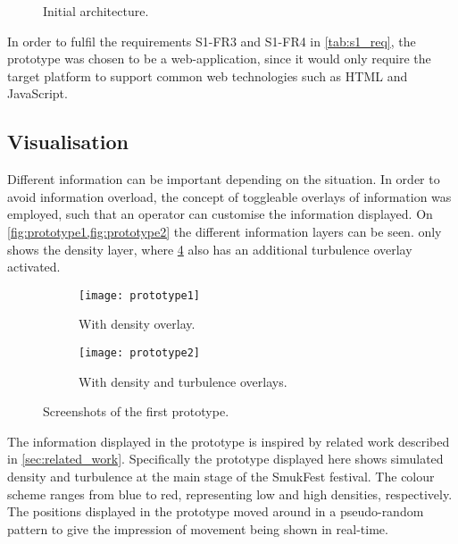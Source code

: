 \begin{figure}[htbp]
    \centering
    \caption{Initial architecture.}
    \label{fig:init_architecture}
\end{figure}


In order to fulfil the requirements S1-FR3 and S1-FR4 in \cref{tab:s1_req}, the prototype was chosen to be a web-application, since it would only require the target platform to support common web technologies such as HTML and JavaScript.

\subsection{Visualisation}
Different information can be important depending on the situation. In order to avoid information overload, the concept of toggleable overlays of information was employed, such that an operator can customise the information displayed. On \cref{fig:prototype1,fig:prototype2} the different information layers can be seen.  only shows the density layer, where \cref{fig:prototype2} also has an additional turbulence overlay activated.

\begin{figure}[htbp]
\centering
\begin{subfigure}{.48\textwidth}
    \texttt{[image: prototype1]}
    \caption{With density overlay.}\label{fig:prototype1}
\end{subfigure}
\quad %
\begin{subfigure}{.48\textwidth}
    \texttt{[image: prototype2]}
    \caption{With density and turbulence overlays.}\label{fig:prototype2}
\end{subfigure}
\caption{Screenshots of the first prototype.}
\end{figure}

The information displayed in the prototype is inspired by related work described in \cref{sec:related_work}. Specifically the prototype displayed here shows simulated density and turbulence at the main stage of the SmukFest festival. The colour scheme ranges from blue to red, representing low and high densities, respectively. The positions displayed in the prototype moved around in a pseudo-random pattern to give the impression of movement being shown in real-time.